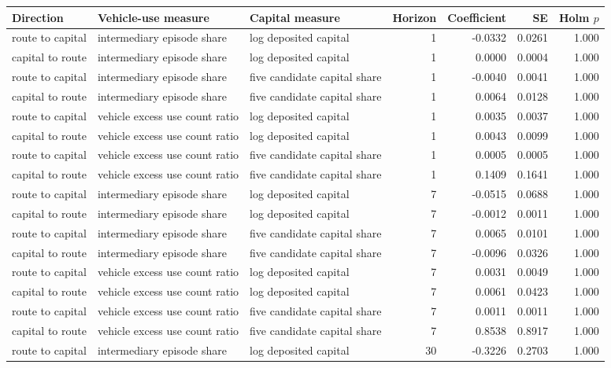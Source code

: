 \begin{tabular}{lllrrrr}
\toprule
Direction & Vehicle-use measure & Capital measure & Horizon & Coefficient & SE & Holm $p$ \\
\midrule
route to capital & intermediary episode share & log deposited capital & 1 & -0.0332 & 0.0261 & 1.000 \\
capital to route & intermediary episode share & log deposited capital & 1 & 0.0000 & 0.0004 & 1.000 \\
route to capital & intermediary episode share & five candidate capital share & 1 & -0.0040 & 0.0041 & 1.000 \\
capital to route & intermediary episode share & five candidate capital share & 1 & 0.0064 & 0.0128 & 1.000 \\
route to capital & vehicle excess use count ratio & log deposited capital & 1 & 0.0035 & 0.0037 & 1.000 \\
capital to route & vehicle excess use count ratio & log deposited capital & 1 & 0.0043 & 0.0099 & 1.000 \\
route to capital & vehicle excess use count ratio & five candidate capital share & 1 & 0.0005 & 0.0005 & 1.000 \\
capital to route & vehicle excess use count ratio & five candidate capital share & 1 & 0.1409 & 0.1641 & 1.000 \\
route to capital & intermediary episode share & log deposited capital & 7 & -0.0515 & 0.0688 & 1.000 \\
capital to route & intermediary episode share & log deposited capital & 7 & -0.0012 & 0.0011 & 1.000 \\
route to capital & intermediary episode share & five candidate capital share & 7 & 0.0065 & 0.0101 & 1.000 \\
capital to route & intermediary episode share & five candidate capital share & 7 & -0.0096 & 0.0326 & 1.000 \\
route to capital & vehicle excess use count ratio & log deposited capital & 7 & 0.0031 & 0.0049 & 1.000 \\
capital to route & vehicle excess use count ratio & log deposited capital & 7 & 0.0061 & 0.0423 & 1.000 \\
route to capital & vehicle excess use count ratio & five candidate capital share & 7 & 0.0011 & 0.0011 & 1.000 \\
capital to route & vehicle excess use count ratio & five candidate capital share & 7 & 0.8538 & 0.8917 & 1.000 \\
route to capital & intermediary episode share & log deposited capital & 30 & -0.3226 & 0.2703 & 1.000 \\

\end{tabular}
